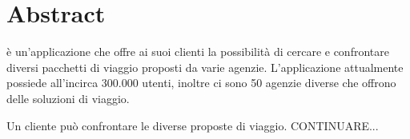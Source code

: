 \section{Abstract}
\AppName è un'applicazione che offre ai suoi clienti la possibilità di cercare e confrontare diversi pacchetti di viaggio proposti da varie agenzie. L'applicazione attualmente possiede all'incirca 300.000 utenti, inoltre ci sono 50 agenzie diverse che offrono delle soluzioni di viaggio.

Un cliente può confrontare le diverse proposte di viaggio. CONTINUARE...